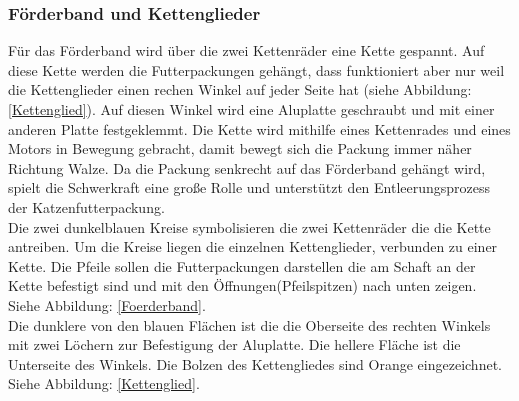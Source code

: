 \subsubsection{Förderband und Kettenglieder}

Für das Förderband wird über die zwei Kettenräder eine Kette gespannt. Auf diese Kette werden die Futterpackungen gehängt, dass funktioniert aber nur weil die Kettenglieder einen rechen Winkel auf jeder Seite hat (siehe Abbildung: \ref{Kettenglied}). Auf diesen Winkel wird eine Aluplatte geschraubt und mit einer anderen Platte festgeklemmt. Die Kette wird mithilfe eines Kettenrades und eines Motors in Bewegung gebracht, damit bewegt sich die Packung immer näher Richtung Walze. Da die Packung senkrecht auf das Förderband gehängt wird, spielt die Schwerkraft eine große Rolle und unterstützt den Entleerungsprozess der Katzenfutterpackung.\\ Die zwei dunkelblauen Kreise symbolisieren die zwei Kettenräder die die Kette antreiben. Um die Kreise liegen die einzelnen Kettenglieder, verbunden zu einer Kette. Die Pfeile sollen die Futterpackungen darstellen die am Schaft an der Kette befestigt sind und mit den Öffnungen(Pfeilspitzen) nach unten zeigen. Siehe Abbildung: \ref{Foerderband}. \\
Die dunklere von den blauen Flächen ist die die Oberseite des rechten Winkels mit zwei Löchern zur Befestigung der Aluplatte. Die hellere Fläche ist die Unterseite des Winkels. Die Bolzen des Kettengliedes sind Orange eingezeichnet. Siehe Abbildung: \ref{Kettenglied}.

